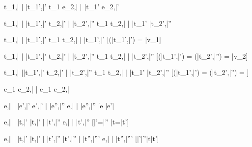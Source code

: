   {t_1,\bar{\sigma} \bar{\stride} \bar{t_1'},\bar{\sigma'}}
  {t_1 \Next e_2,\bar{\sigma} \bar{\stride} \bar{t_1'} \Next e_2,\bar{\sigma'}}


  {t_1,\bar{\sigma}  \bar{\stride} \bar{t_1'},\bar{\sigma'}  \Quad
   t_2,\bar{\sigma'} \bar{\stride} \bar{t_2'},\bar{\sigma''}}
  {t_1 \And t_2,\bar{\sigma} \bar{\stride} \bar{t_1'} \And \bar{t_2'},\bar{\sigma''}}


  {t_1,\bar{\sigma}  \bar{\stride} \bar{t_1'},\bar{\sigma'}}
  {t_1 \Or t_2,\bar{\sigma} \bar{\stride} \bar{t_1'},\bar{\sigma'}}
  [\Value(\bar{t_1'},\bar{\sigma'}) = \bar{v_1}]

  {t_1,\bar{\sigma}  \bar{\stride} \bar{t_1'},\bar{\sigma'}  \Quad
   t_2,\bar{\sigma'} \bar{\stride} \bar{t_2'},\bar{\sigma''}}
  {t_1 \Or t_2,\bar{\sigma} \bar{\stride} \bar{t_2'},\bar{\sigma''}}
  [\Value(\bar{t_1'},\bar{\sigma'}) = \bot \land \Value(\bar{t_2'},\bar{\sigma''}) = \bar{v_2}]

  {t_1,\bar{\sigma}  \bar{\stride }\bar{t_1'},\bar{\sigma'}  \Quad
   t_2,\bar{\sigma' }\bar{\stride} \bar{t_2'},\bar{\sigma''}}
  {t_1 \Or t_2,\bar{\sigma} \bar{\stride} \bar{t_1'} \Or \bar{t_2'},\bar{\sigma''}}
  [\Value(\bar{t_1'},\bar{\sigma'}) = \bot \land \Value(\bar{t_2'},\bar{\sigma''}) = \bot]


  { }
  {e_1 \Xor e_2,\bar{\sigma} \bar{\stride} e_1 \Xor e_2,\bar{\sigma}}

    {e,\bar{\sigma} \bar{\eval} \bar{e'},\bar{\sigma'}  \Quad
     e',\bar{\sigma'} \bar{\stride} \bar{e''},\bar{\sigma''}}
    {e,\bar{\sigma} \bar{\stride} \bar{e''},\bar{\sigma''}}
    [e \neq \bar{e'}]


    {e,\bar{\sigma} \bar{\eval} \bar{t},\bar{\sigma'} \Quad
     \bar{t},\bar{\sigma'} \bar{\stride} \bar{t'},\bar{\sigma''}}
    {e,\bar{\sigma} \bar{\normalise} \bar{t'},\bar{\sigma''}}
    [\bar{\sigma'}=\bar{\sigma''} \land \bar{t}=\bar{t'}]

    {e,\bar{\sigma} \bar{\eval} \bar{t},\bar{\sigma'}  \Quad
     \bar{t},\bar{\sigma'} \bar{\stride} \bar{t'},\bar{\sigma''}  \Quad
     \bar{t'},\bar{\sigma''} \bar{\normalise} \bar{t''},\bar{\sigma'''}}
    {e,\bar{\sigma} \bar{\normalise} \bar{t''},\bar{\sigma'''}}
    [\bar{\sigma'}\neq \bar{\sigma''}\vee \bar{t}\neq \bar{t'}]



